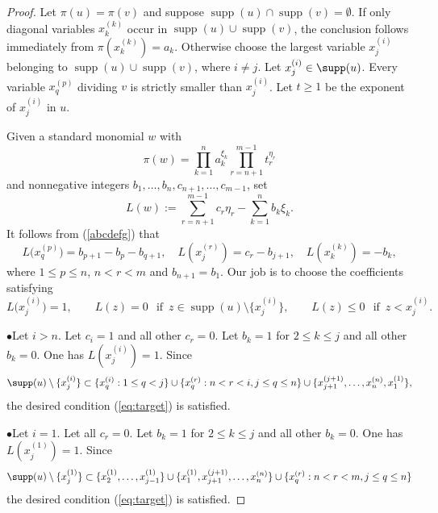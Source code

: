 \documentclass[12pt]{amsart}
\numberwithin{equation}{section}
\begin{document}
\begin{proof}
Let $\pi(u)=\pi(v)$ and suppose  $\operatorname{supp}(u)\cap\operatorname{supp}(v)=\emptyset$. If only diagonal variables $x_k^{(k)}$ occur in $\operatorname{supp}(u)\cup\operatorname{supp}(v)$, the conclusion follows immediately from $\pi(x_k^{(k)})=a_k$. Otherwise choose the largest variable $x_j^{(i)}$ belonging to $\operatorname{supp}(u)\cup\operatorname{supp}(v)$, where $i\ne j$.  Let $x_j^{(i)} \in \supp(u)$.  Every variable $x_q^{(p)}$ dividing $v$ is strictly smaller than $x_j^{(i)}$. Let $t\ge1$ be the exponent of $x_j^{(i)}$ in $u$.

Given a standard monomial $w$ with $$\pi(w)= \prod_{k=1}^{n} a_k^{\xi_k}\prod_{r=n+1}^{m-1} t_r^{\eta_r}$$ and nonnegative integers $b_1,\ldots,b_n, c_{n+1}, \ldots, c_{m-1}$, 
set
\[
L(w):=\sum_{r=n+1}^{m-1}c_r \eta_r-\sum_{k=1}^{n}b_k \xi_k.
\]
It follows from (\ref{abcdefg}) that
\begin{equation}\label{eq:weight}
L\bigl(x_q^{(p)}\bigr)=b_{p+1}-b_p-b_{q+1},\quad 
L(x_j^{(r)})=c_r - b_{j+1}, \quad
L(x_k^{(k)})=-b_k,
\end{equation}
where $1\le p\le n$, $n<r<m$ and $b_{n+1}=b_1$.  Our job is to choose the coefficients satisfying
\begin{equation}\label{eq:target}
L\bigl(x_j^{(i)}\bigr)=1,\qquad
L(z)=0\ \,\,\,  \text{if} \,\,\, z\in\operatorname{supp}(u)\setminus\{x_j^{(i)}\},\qquad
L(z)\le0\  \, \,\,  \text{if} \,\,\, z<x_j^{(i)}.
\end{equation}

\smallskip

\noindent
$\bullet$\quad Let $i>n$.
Let $c_i=1$ and all other $c_r=0$.  Let $b_k=1$ for $2\le k\le j$
and all other $b_k=0$.  One has $L(x_j^{(i)})=1$.  Since
\[
\supp(u) \setminus\{x_j^{(i)}\} \subset 
\{x_q^{(i)} : 1 \leq q < j\} \cup \{x_q^{(r)} : n < r < i, j \leq q \leq n \} \cup \{ x_{j+1}^{(j+1)}, \ldots, x_{n}^{(n)}, x_1^{(1)}\},
\]
the desired condition (\ref{eq:target}) is satisfied.

\smallskip

\noindent
$\bullet$\quad   Let $i=1$.  Let all $c_r=0$.  Let $b_k=1$ for $2\le k\le j$ and all other $b_k=0$.  One has $L(x_j^{(1)})=1$.  Since
\[
\supp(u) \setminus\{x_j^{(1)}\} \subset \{x_2^{(1)}, \ldots, x_{j-1}^{(1)}\} \cup \{x_1^{(1)}, x_{j+1}^{(j+1)}, \ldots, x_{n}^{(n)}\} \cup \{x_q^{(r)} : n < r < m, j \leq q \leq n \}
\]
the desired condition (\ref{eq:target}) is satisfied.

\smallskip


\end{proof}
\end{document}
